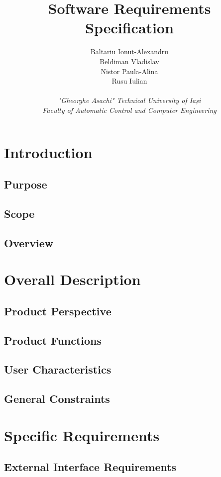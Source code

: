 \documentclass{article}
\title{\textbf{Software Requirements Specification}}
\author
{
	Baltariu Ionuț-Alexandru
	\\
	Beldiman Vladislav
	\\
	Nistor Paula-Alina 
	\\
	Rusu Iulian
	\\
	\\
	\textit{"Gheorghe Asachi" Technical University of Iași}
	\\
	\textit{Faculty of Automatic Control and Computer Engineering}
}
\date{}
\begin{document}
\maketitle 

\newpage
\tableofcontents

\section{Introduction}
\subsection{Purpose}
\subsection{Scope}
\subsection{Overview}

\section{Overall Description}
\subsection{Product Perspective}
\subsection{Product Functions}
\subsection{User Characteristics}
\subsection{General Constraints}

\section{Specific Requirements}
\subsection{External Interface Requirements}
\end{document}

